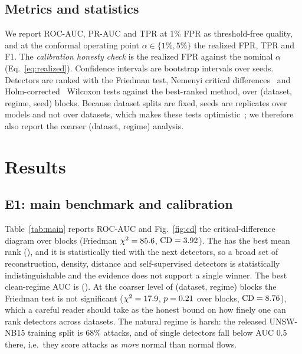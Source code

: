 \documentclass[journal]{IEEEtran}
\begin{document}
\subsection{Metrics and statistics}
We report ROC-AUC, PR-AUC and TPR at 1\% FPR as threshold-free quality, and at the conformal operating point $\alpha\in\{1\%,5\%\}$ the realized FPR, TPR and F1. The \emph{calibration honesty check} is the realized FPR against the nominal $\alpha$ (Eq.~\ref{eq:realized}). Confidence intervals are bootstrap intervals over seeds. Detectors are ranked with the Friedman test, Nemenyi critical differences~\cite{demsar2006} and Holm-corrected~\cite{holm1979} Wilcoxon tests against the best-ranked method, over (dataset, regime, seed) blocks. Because dataset splits are fixed, seeds are replicates over models and not over datasets, which makes these tests optimistic~\cite{benavoli2016}; we therefore also report the coarser (dataset, regime) analysis.

\section{Results}
\label{sec:results}
\subsection{E1: main benchmark and calibration}
Table~\ref{tab:main} reports ROC-AUC and Fig.~\ref{fig:cd} the critical-difference diagram over \friedmanBlocks{} blocks (Friedman $\chi^2=85.6$, $\mathrm{CD}=3.92$). The \bestDetector{} has the best mean rank (\bestRank), and it is statistically tied with the next \nTied{} detectors, so a broad set of reconstruction, density, distance and self-supervised detectors is statistically indistinguishable and the evidence does not support a single winner. The best clean-regime AUC is \bestCleanAuc{} (\bestCleanName). At the coarser level of (dataset, regime) blocks the Friedman test is not significant ($\chi^2=17.9$, $p=0.21$ over \drBlocks{} blocks, $\mathrm{CD}=8.76$), which a careful reader should take as the honest bound on how finely one can rank detectors across datasets. The natural regime is harsh: the released UNSW-NB15 training split is 68\% attacks, and \unswNaturalBelow{} of \unswNaturalN{} single detectors fall below AUC 0.5 there, i.e.\ they score attacks as \emph{more} normal than normal flows.

\begin{table}[!t]
\caption{ROC-AUC (mean over seeds) for single detectors and conformal ensembles. C and N denote the clean and natural regimes. Bold: best single detector per column; underlined: second best. ``Rank'' is the mean rank over all blocks.}
\label{tab:main}
\centering\small

\end{table}
\end{document}
